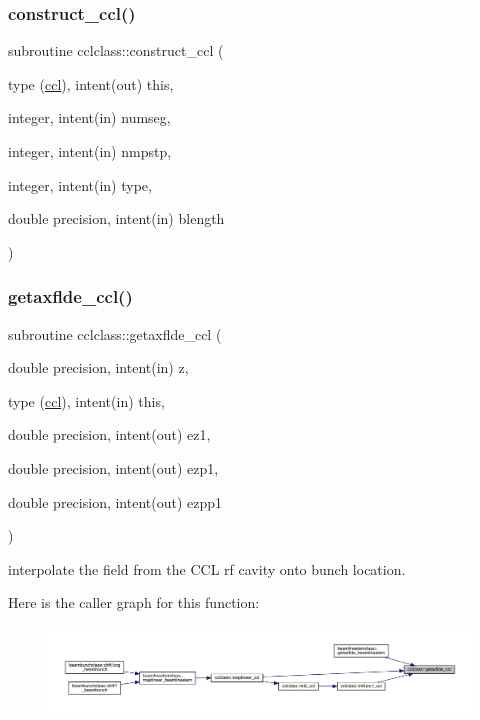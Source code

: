 \subsubsection{\texorpdfstring{construct\_ccl()}{construct\_ccl()}}
{\footnotesize\ttfamily subroutine cclclass\+::construct\+\_\+ccl (\begin{DoxyParamCaption}\item[{type (\mbox{\hyperlink{namespacecclclass_structcclclass_1_1ccl}{ccl}}), intent(out)}]{this,  }\item[{integer, intent(in)}]{numseg,  }\item[{integer, intent(in)}]{nmpstp,  }\item[{integer, intent(in)}]{type,  }\item[{double precision, intent(in)}]{blength }\end{DoxyParamCaption})}

\mbox{\label{namespacecclclass_a881db4a51cdc73a6c489b2814565a243}} 
\subsubsection{\texorpdfstring{getaxflde\_ccl()}{getaxflde\_ccl()}}
{\footnotesize\ttfamily subroutine cclclass\+::getaxflde\+\_\+ccl (\begin{DoxyParamCaption}\item[{double precision, intent(in)}]{z,  }\item[{type (\mbox{\hyperlink{namespacecclclass_structcclclass_1_1ccl}{ccl}}), intent(in)}]{this,  }\item[{double precision, intent(out)}]{ez1,  }\item[{double precision, intent(out)}]{ezp1,  }\item[{double precision, intent(out)}]{ezpp1 }\end{DoxyParamCaption})}



interpolate the field from the C\+CL rf cavity onto bunch location. 

Here is the caller graph for this function\+:\nopagebreak
\begin{figure}[H]
\begin{center}
\leavevmode
\includegraphics[width=350pt]{namespacecclclass_a881db4a51cdc73a6c489b2814565a243_icgraph}
\end{center}
\end{figure}
\mbox{\label{namespacecclclass_a06d52f7ecb50e977ef5e2330506180d2}} 
